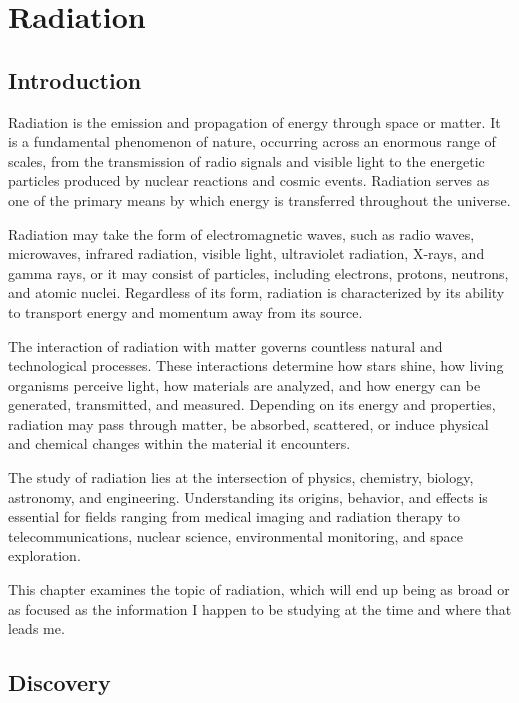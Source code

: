 \chapter{Radiation}
\thispagestyle{fancy}

\section{Introduction}

Radiation is the emission and propagation of energy through space or matter. It is a fundamental phenomenon of nature, occurring across an enormous range of scales, from the transmission of radio signals and visible light to the energetic particles produced by nuclear reactions and cosmic events. Radiation serves as one of the primary means by which energy is transferred throughout the universe.

Radiation may take the form of electromagnetic waves, such as radio waves, microwaves, infrared radiation, visible light, ultraviolet radiation, X-rays, and gamma rays, or it may consist of particles, including electrons, protons, neutrons, and atomic nuclei. Regardless of its form, radiation is characterized by its ability to transport energy and momentum away from its source.

The interaction of radiation with matter governs countless natural and technological processes. These interactions determine how stars shine, how living organisms perceive light, how materials are analyzed, and how energy can be generated, transmitted, and measured. Depending on its energy and properties, radiation may pass through matter, be absorbed, scattered, or induce physical and chemical changes within the material it encounters.

The study of radiation lies at the intersection of physics, chemistry, biology, astronomy, and engineering. Understanding its origins, behavior, and effects is essential for fields ranging from medical imaging and radiation therapy to telecommunications, nuclear science, environmental monitoring, and space exploration.

This chapter examines the topic of radiation, which will end up being as broad or as focused as the information I happen to be studying at the time and where that leads me.








\section{Discovery}

